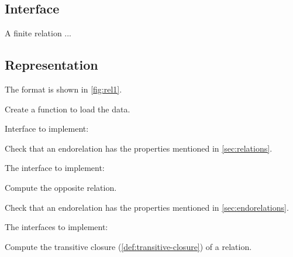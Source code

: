 \subsection{Interface}

A finite relation  ...


\subsection{Representation}

The format is shown in \cref{fig:rel1}.


\begin{exercise}
  Create a function to load the data.

  Interface to implement:
%

\end{exercise}


%  

\begin{exercise}

  Check that an endorelation has the properties mentioned in \cref{sec:relations}.

  The interface to implement:

\end{exercise}




\begin{exercise}[Opposite]
  Compute the opposite relation.


\end{exercise}

\begin{exercise}

  Check that an endorelation has the properties mentioned in \cref{sec:endorelations}.

  The interfaces to implement:

\end{exercise}

\begin{exercise}
  Compute the transitive closure (\cref{def:transitive-closure}) of a relation.


\end{exercise}


